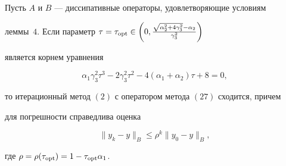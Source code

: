  


\begin{thm} 


Пусть $A$ и $B$ --- диссипативные операторы, удовлетворяющие условиям 


леммы~$4$. Если параметр $\tau=\tau_{\opt}\in\left(0, 


\frac{\sqrt{\alpha^2_2+4\gamma^2_3}-\alpha_2}{\gamma^2_3}\right)$ 


является корнем уравнения 


\begin{equation} 


\alpha_1\gamma^2_3\tau^3-2\gamma^2_3\tau^2- 


4(\alpha_1+\alpha_2)\tau+8=0, 


\end{equation} 


то итерационный метод $(2)$ с оператором метода $(27)$ сходится, причем 


для погрешности справедлива оценка 


$$ 


\|y_k-y\|_B\le\rho^k\|y_0-y\|_B, 


$$ 


где $\rho=\rho(\tau_{\operatorname{opt}})=1-\tau_{\operatorname{opt}}\alpha_1$. 


\end{thm} 


 



